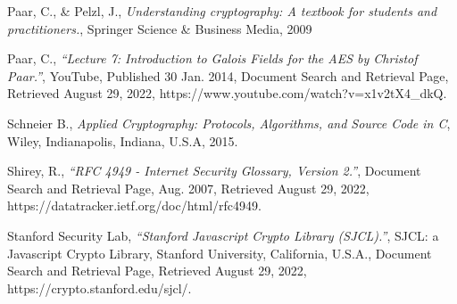 \begin{thebibliography}{11}
  Paar, C., \& Pelzl, J.,
 \emph{Understanding cryptography: A textbook for students and practitioners.},
  Springer Science \& Business Media,
  2009
  
  Paar, C.,
  \emph{“Lecture 7: Introduction to Galois Fields for the AES by Christof Paar.”},
  YouTube,
  Published 30 Jan. 2014, 
  Document Search and Retrieval Page,
  Retrieved August 29, 2022,
  https://www.youtube.com/watch?v=x1v2tX4\_dkQ.
  
    
  Schneier B.,
  \emph{Applied Cryptography: Protocols, Algorithms, and Source Code in C},
  Wiley, Indianapolis, Indiana, U.S.A,
  2015.

  Shirey, R.,
  \emph{“RFC 4949 - Internet Security Glossary, Version 2.”},
  Document Search and Retrieval Page,
  Aug. 2007,
  Retrieved August 29, 2022, 
  https://datatracker.ietf.org/doc/html/rfc4949. 


  Stanford Security Lab,
  \emph {“Stanford Javascript Crypto Library (SJCL).”},
   SJCL: a Javascript Crypto Library, 
   Stanford University, California, U.S.A.,
   Document Search and Retrieval Page,
   Retrieved August 29, 2022,
   https://crypto.stanford.edu/sjcl/.

\end{thebibliography}